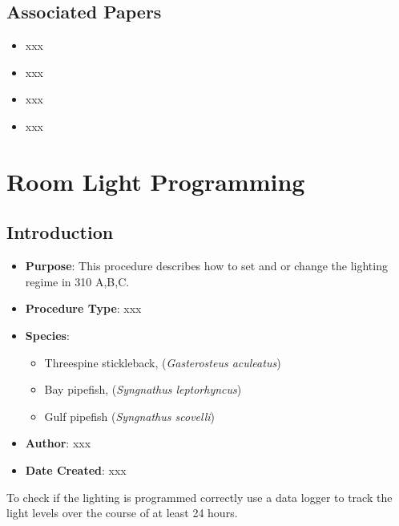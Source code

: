 \documentclass[
  letterpaper,
  DIV=11,
  numbers=noendperiod]{scrreprt}
\providecommand{\tightlist}{%
  \setlength{\itemsep}{0pt}\setlength{\parskip}{0pt}}\usepackage{longtable,booktabs,array}
\begin{document}
\hypertarget{associated-papers-29}{%
\section{Associated Papers}\label{associated-papers-29}}

\begin{itemize}
\tightlist
\item
  xxx
\item
  xxx
\item
  xxx
\item
  xxx
\end{itemize}

\hypertarget{sec-husbandry-room_lighting}{%
\chapter{Room Light Programming}\label{sec-husbandry-room_lighting}}

\hypertarget{introduction-43}{%
\section{Introduction}\label{introduction-43}}

\begin{itemize}
\tightlist
\item
  \textbf{Purpose}: This procedure describes how to set and or change
  the lighting regime in 310 A,B,C.
\item
  \textbf{Procedure Type}: xxx
\item
  \textbf{Species}:

  \begin{itemize}
  \tightlist
  \item
    Threespine stickleback, (\emph{Gasterosteus aculeatus})
  \item
    Bay pipefish, (\emph{Syngnathus leptorhyncus})
  \item
    Gulf pipefish (\emph{Syngnathus scovelli})
  \end{itemize}
\item
  \textbf{Author}: xxx
\item
  \textbf{Date Created}: xxx
\end{itemize}

\begin{tcolorbox}[enhanced jigsaw, rightrule=.15mm, title=\textcolor{quarto-callout-warning-color}{\faExclamationTriangle}\hspace{0.5em}{NOTES}, titlerule=0mm, opacitybacktitle=0.6, toprule=.15mm, bottomrule=.15mm, opacityback=0, left=2mm, colframe=quarto-callout-warning-color-frame, breakable, coltitle=black, colback=white, colbacktitle=quarto-callout-warning-color!10!white, bottomtitle=1mm, leftrule=.75mm, toptitle=1mm, arc=.35mm]

To check if the lighting is programmed correctly use a data logger to
track the light levels over the course of at least 24 hours.

\end{tcolorbox}
\end{document}
